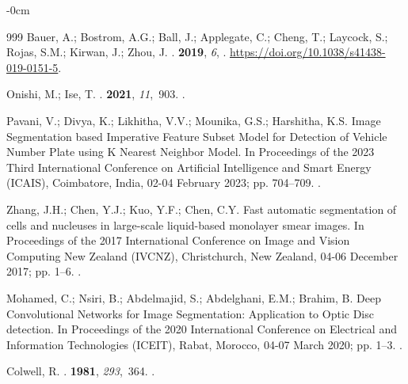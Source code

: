 \documentclass[analytics,article,accept,pdftex,moreauthors]{Definitions/mdpi}
\begin{document}
\begin{adjustwidth}{-\extralength}{0cm}
\begin{thebibliography}{999}
Bauer, A.; Bostrom, A.G.; Ball, J.; Applegate, C.; Cheng, T.; Laycock, S.;
  Rojas, S.M.; Kirwan, J.; Zhou, J.
.
 {\bf 2019}, {\em 6}, 
. {\url{https://doi.org/10.1038/s41438-019-0151-5}}.

Onishi, M.; Ise, T.
.
 {\bf 2021}, {\em 11},~903.
.

Pavani, V.; Divya, K.; Likhitha, V.V.; Mounika, G.S.; Harshitha, K.S.
\newblock Image Segmentation based Imperative Feature Subset Model for
  Detection of Vehicle Number Plate using K Nearest Neighbor Model.
\newblock In Proceedings of the 2023 Third International Conference on
  Artificial Intelligence and Smart Energy (ICAIS), Coimbatore, India, 02-04 February 2023; pp. 704--709.
.

Zhang, J.H.; Chen, Y.J.; Kuo, Y.F.; Chen, C.Y.
\newblock Fast automatic segmentation of cells and nucleuses in large-scale
  liquid-based monolayer smear images.
\newblock In Proceedings of the 2017 International Conference on Image and
  Vision Computing New Zealand (IVCNZ), Christchurch, New Zealand, 04-06 December 2017; pp. 1--6.
.

Mohamed, C.; Nsiri, B.; Abdelmajid, S.; Abdelghani, E.M.; Brahim, B.
\newblock Deep Convolutional Networks for Image Segmentation: Application to
  Optic Disc detection.
\newblock In Proceedings of the 2020 International Conference on Electrical and
  Information Technologies (ICEIT), Rabat, Morocco, 04-07 March 2020; pp. 1--3.
.

Colwell, R.
.
 {\bf 1981}, {\em 293},~364.
.


\end{thebibliography}
\end{adjustwidth}
\end{document}
